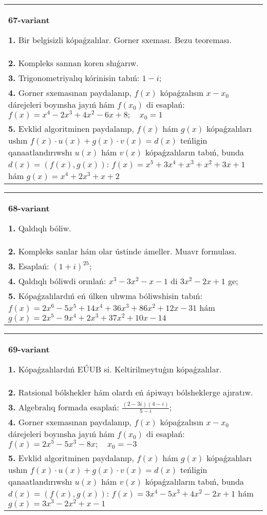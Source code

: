 \documentclass{article}
\begin{document}
\begin{tabular}{m{17cm}}
\textbf{67-variant}
\newline

\textbf{1.} Bir belgisizli kópaǵzalılar. Gorner sxeması. Bezu teoreması.  \\
\textbf{2.} Kompleks sannan koren shıǵarıw. \\
\textbf{3.} Trigonometriyalıq kórinisin tabıń: $1-i$; \\
\textbf{4.} Gorner sxemasınan paydalanıp, $f(x)$ kópaǵzalısın $x-x_0$ dárejeleri boyınsha jayıń hám $f\left(x_0\right)$ di esaplań: $f(x)=x^4-2 x^3+4 x^2-6 x+8 ; \quad x_0=1$ \\
\textbf{5.} Evklid algoritminen paydalanıp, $f(x)$ hám $g(x)$ kópaǵzalıları ushın $f(x) \cdot u(x)+g(x) \cdot v(x)=d(x)$ teńligin qanaatlandırıwshı $u(x)$ hám $v(x)$ kópaǵzalıların tabıń, bunda $d(x)=(f(x), g(x))$:  $f(x)=x^5+3 x^4+x^3+x^2+3 x+1$ hám $g(x)=x^4+2 x^3+x+2$ \\

\end{tabular}
\vspace{1cm}


\begin{tabular}{m{17cm}}
\textbf{68-variant}
\newline

\textbf{1.} Qaldıqlı bóliw.  \\
\textbf{2.} Kompleks sanlar hám olar ústinde ámeller. Muavr formulası.  \\
\textbf{3.} Esaplań:  $(1+i)^{25}$; \\
\textbf{4.} Qaldıqlı bóliwdi orınlań: $x^3-3 x^2-x-1$ di $3 x^2-2 x+1$ ge; \\
\textbf{5.} Kópaǵzalılardıń eń úlken ulıwma bóliwshisin tabıń:  $f(x)=2 x^6-5 x^5+14 x^4+36 x^3+86 x^2+12 x-31$ hám $g(x)=2 x^5-9 x^4+2 x^3+37 x^2+10 x-14$ \\

\end{tabular}
\vspace{1cm}


\begin{tabular}{m{17cm}}
\textbf{69-variant}
\newline

\textbf{1.} Kópaǵzalılardıń EÚUB si. Keltirilmeytuǵın   kópaǵzalılar. \\
\textbf{2.} Ratsional bólshekler hám olardı eń ápiwayı bólsheklerge ajıratıw. \\
\textbf{3.} Algebralıq formada esaplań: $\frac{(2-3 i)(4-i)}{5-i}$; \\
\textbf{4.} Gorner sxemasınan paydalanıp, $f(x)$ kópaǵzalısın $x-x_0$ dárejeleri boyınsha jayıń hám $f\left(x_0\right)$ di esaplań: $f(x)=2 x^5-5 x^3-8 x ; \quad x_0=-3$ \\
\textbf{5.} Evklid algoritminen paydalanıp, $f(x)$ hám $g(x)$ kópaǵzalıları ushın $f(x) \cdot u(x)+g(x) \cdot v(x)=d(x)$ teńligin qanaatlandırıwshı $u(x)$ hám $v(x)$ kópaǵzalıların tabıń, bunda $d(x)=(f(x), g(x))$:  $f(x)=3 x^4-5 x^3+4 x^2-2 x+1$ hám $g(x)=3 x^3-2 x^2+x-1$ \\

\end{tabular}
\vspace{1cm}
\end{document}
